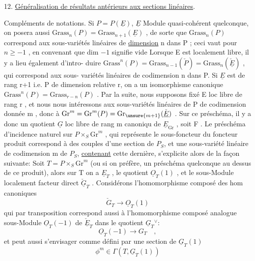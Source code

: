 
12. \uline{Généralisation de résultats antérieurs aux sections linéaires}.

Compléments de notations. Si $P = P(\underline{E})$, $\underline{E}$ Module quasi-cohérent
quelconque, on posera aussi $\mathrm{Grass}_n(P) = \mathrm{Grass}_{n+1}(\underline{E})$ , de sorte que
$\mathrm{Grass}_n(P)$ correspond aux sous-variétés linéaires de \uline{dimension} n dans
P ; ceci vaut pour $n \geq -1$ , en convenant que dim $-1$ signifie vide
Lorsque E est localement libre,  il y a lieu également d'intro-%
duire $\mathrm{Grass}^n(P) = \mathrm{Grass}_{n-1}(\check{P}) = \mathrm{Grass}_n(\check{\underline{E}})$ , qui correspond aux sous-%
variétés linéaires de codimension n dans P. Si $\underline{E}$ est de rang r+1 i.e.
P de dimension relative r, on a un isomorphisme canonique
$\mathrm{Grass}^n(P) = \mathrm{Grass}_{r-n}(P)$ . Par la suite, nous supposons fixé E loc
libre de rang r , et nous nous intéressons aux sous-variétés linéaires
de P de codimension donnée m , donc à $\mathrm{Gr}^m = \mathrm{Gr}^m(P) = \mathrm{Gr}_{\unsure{m+1}}(\check{\underline{E}})$ .
Sur ce préschéma, il y a donc un quotient $\underline{G}$ loc libre de rang m canoniqu
de $\underline{E}_{\mathrm{Gr}}$ , soit F .  Le préschéma d'incidence naturel
sur $P\times_S \mathrm{Gr}^m$ , qui représente le sous-foncteur du foncteur produit
correspond à des couples d'une section de $P_S$, et une sous-variété
linéaire de codimension m de $P_S$, \uline{contenant} cette dernière, s'explicite
alors de la façon suivante: Soit $T=P\times_S \mathrm{Gr}^m$ (ou si on préfère, un
préschéma quelconque au dessus de ce produit), alors sur  T on a
$\underline{E}_T$ , le quotient $\underline{O}_T(1)$ , et le sous-Module localement facteur direct
$\check{\underline{G}}_T$ . Considérons l'homomorphisme composé des hom canoniques
\[ \check{G}_T \longrightarrow \underline{O}_T(1) \]
qui par transposition correspond aussi à l'homomorphisme composé
analogue  sous-Module $\underline{O}_T(-1)$ de $\check{\underline{E}}_T$ dans le quotient $\underline{G}_T{}^{\vee}$:
\[ \underline{O}_T(-1) \longrightarrow G_T \quad , \]
et peut aussi s'envisager comme défini par une section de $\underline{G}_T(1)$
\[ \phi^m \in \Gamma(T, \underline{G}_T(1)) \]

